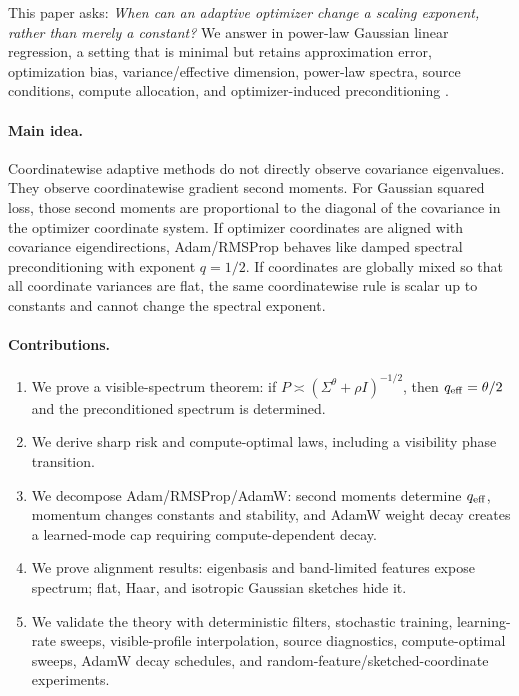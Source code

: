 \documentclass{article}
\begin{document}
This paper asks: \emph{When can an adaptive optimizer change a scaling exponent, rather than merely a constant?}  We answer in power-law Gaussian linear regression, a setting that is minimal but retains approximation error, optimization bias, variance/effective dimension, power-law spectra, source conditions, compute allocation, and optimizer-induced preconditioning \citep{bartlett2020benign,hastie2022surprises,bordelon2020spectrum,canatar2021spectral,lin2024scaling}.

\paragraph{Main idea.} Coordinatewise adaptive methods do not directly observe covariance eigenvalues.  They observe coordinatewise gradient second moments.  For Gaussian squared loss, those second moments are proportional to the diagonal of the covariance in the optimizer coordinate system.  If optimizer coordinates are aligned with covariance eigendirections, Adam/RMSProp behaves like damped spectral preconditioning with exponent $q=1/2$.  If coordinates are globally mixed so that all coordinate variances are flat, the same coordinatewise rule is scalar up to constants and cannot change the spectral exponent.

\paragraph{Contributions.}
\begin{enumerate}[leftmargin=1.4em,itemsep=0.25em]
    \item We prove a visible-spectrum theorem: if $P\asymp(\Sigma^\theta+\rho I)^{-1/2}$, then $q_{\rm eff}=\theta/2$ and the preconditioned spectrum is determined.
    \item We derive sharp risk and compute-optimal laws, including a visibility phase transition.
    \item We decompose Adam/RMSProp/AdamW: second moments determine $q_{\rm eff}$, momentum changes constants and stability, and AdamW weight decay creates a learned-mode cap requiring compute-dependent decay.
    \item We prove alignment results: eigenbasis and band-limited features expose spectrum; flat, Haar, and isotropic Gaussian sketches hide it.
    \item We validate the theory with deterministic filters, stochastic training, learning-rate sweeps, visible-profile interpolation, source diagnostics, compute-optimal sweeps, AdamW decay schedules, and random-feature/sketched-coordinate experiments.
\end{enumerate}
\end{document}
